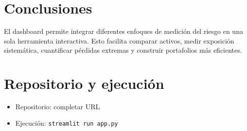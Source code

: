 \documentclass[11pt]{article}
\begin{document}
\section{Conclusiones}
El dashboard permite integrar diferentes enfoques de medición del riesgo en una sola herramienta interactiva. Esto facilita comparar activos, medir exposición sistemática, cuantificar pérdidas extremas y construir portafolios más eficientes.

\section*{Repositorio y ejecución}
\begin{itemize}
    \item Repositorio: completar URL
    \item Ejecución: \texttt{streamlit run app.py}
\end{itemize}
\end{document}
